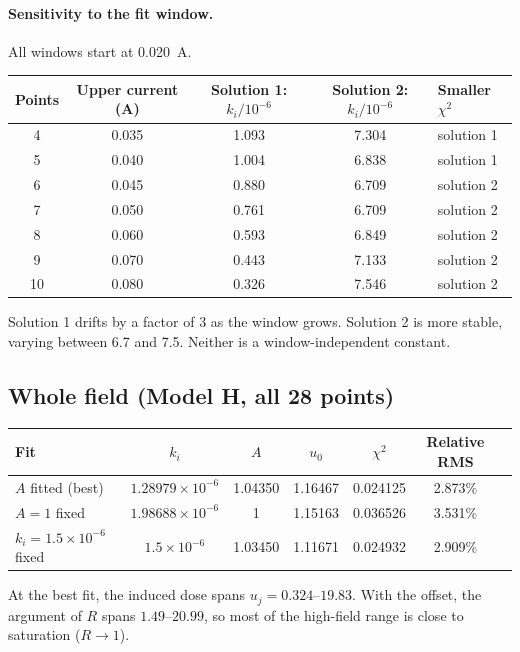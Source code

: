\documentclass[11pt,a4paper]{article}
\begin{document}
\paragraph{Sensitivity to the fit window.} All windows start at 0.020~A.
\begin{center}
\begin{tabular}{ccccl}
\toprule
Points & Upper current (A) & Solution 1: $k_i/10^{-6}$ & Solution 2: $k_i/10^{-6}$ & Smaller $\chi^2$\\
\midrule
4  & 0.035 & 1.093 & 7.304 & solution 1\\
5  & 0.040 & 1.004 & 6.838 & solution 1\\
6  & 0.045 & 0.880 & 6.709 & solution 2\\
7  & 0.050 & 0.761 & 6.709 & solution 2\\
8  & 0.060 & 0.593 & 6.849 & solution 2\\
9  & 0.070 & 0.443 & 7.133 & solution 2\\
10 & 0.080 & 0.326 & 7.546 & solution 2\\
\bottomrule
\end{tabular}
\end{center}
Solution 1 drifts by a factor of 3 as the window grows. Solution 2 is more stable, varying between 6.7 and 7.5. Neither is a window-independent constant.

\subsection{Whole field (Model H, all 28 points)}
\label{sec:res-whole}

\begin{center}
\begin{tabular}{lcccccc}
\toprule
Fit & $k_i$ & $A$ & $u_0$ & $\chi^2$ & Relative RMS\\
\midrule
$A$ fitted (best)             & $1.28979\times10^{-6}$ & 1.04350 & 1.16467 & 0.024125 & 2.873\%\\
$A = 1$ fixed                 & $1.98688\times10^{-6}$ & 1       & 1.15163 & 0.036526 & 3.531\%\\
$k_i = 1.5\times10^{-6}$ fixed & $1.5\times10^{-6}$    & 1.03450 & 1.11671 & 0.024932 & 2.909\%\\
\bottomrule
\end{tabular}
\end{center}
At the best fit, the induced dose spans $u_j = 0.324$--$19.83$. With the offset, the argument of $R$ spans $1.49$--$20.99$, so most of the high-field range is close to saturation ($R\to 1$).
\end{document}
